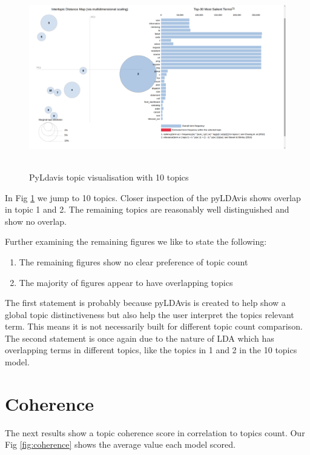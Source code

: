 \begin{figure}[h]
    \centering
    \includegraphics[width=15cm, height=8cm,trim=0 0 100px 0, clip=true]{figures/pyldavis/pyldavis_10.png}
    \caption{PyLdavis topic visualisation with 10 topics}
    \label{fig:pyldavis_10}
\end{figure}

In Fig \ref{fig:pyldavis_10} we jump to 10 topics. Closer inspection of the pyLDAvis shows overlap in topic 1 and 2. The remaining topics are reasonably well distinguished and show no overlap. 

Further examining the remaining figures we like to state the following:
\begin{enumerate}
  \item The remaining figures show no clear preference of topic count
  \item The majority of figures appear to have overlapping topics
\end{enumerate}
The first statement is probably because pyLDAvis is created to help show a global topic distinctiveness but also help the user interpret the topics relevant term. This means it is not necessarily built for different topic count comparison. The second statement is once again due to the nature of LDA which has overlapping terms in different topics, like the topics in 1 and 2 in the 10 topics model.

\FloatBarrier
\section{Coherence}\label{results:coherence}
The next results show a topic coherence score in correlation to topics count. Our Fig \ref{fig:coherence} shows the average value each model scored. 

